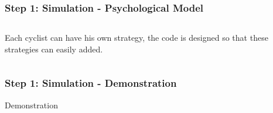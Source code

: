 \documentclass{beamer}
\begin{document}
\begin{frame}
\frametitle{Step 1: Simulation - Psychological Model}

\begin{columns}
  \begin{column}{0.6\textwidth}
    Each cyclist can have his own strategy, the code is designed so that these strategies can easily added.\\
    \begin{itemize}
    \end{itemize}
  \end{column}
  
  \begin{column}{0.4\textwidth}
  \end{column}
\end{columns}

\end{frame}


\begin{frame}
\frametitle{Step 1: Simulation - Demonstration}
\huge
\hspace{3.5cm} Demonstration
\end{frame}
\end{document}

